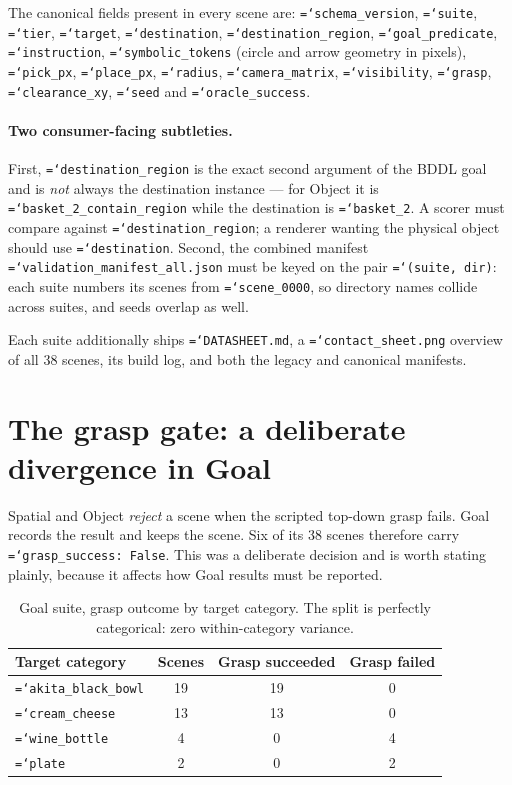 \documentclass[11pt,a4paper]{article}
\newcommand{\code}[1]{\texttt{\small\hyphenchar\font=`\-\relax #1}}
\begin{document}
The canonical fields present in every scene are: \code{schema\_version},
\code{suite}, \code{tier}, \code{target}, \code{destination},
\code{destination\_region}, \code{goal\_predicate}, \code{instruction},
\code{symbolic\_tokens} (circle and arrow geometry in pixels), \code{pick\_px},
\code{place\_px}, \code{radius}, \code{camera\_matrix}, \code{visibility},
\code{grasp}, \code{clearance\_xy}, \code{seed} and \code{oracle\_success}.

\paragraph{Two consumer-facing subtleties.}
First, \code{destination\_region} is the exact second argument of the BDDL goal
and is \emph{not} always the destination instance --- for Object it is
\code{basket\_2\_contain\_region} while the destination is \code{basket\_2}. A
scorer must compare against \code{destination\_region}; a renderer wanting the
physical object should use \code{destination}. Second, the combined manifest
\code{validation\_manifest\_all.json} must be keyed on the pair
\code{(suite, dir)}: each suite numbers its scenes from \code{scene\_0000}, so
directory names collide across suites, and seeds overlap as well.

Each suite additionally ships \code{DATASHEET.md}, a \code{contact\_sheet.png}
overview of all 38 scenes, its build log, and both the legacy and canonical
manifests.

\section{The grasp gate: a deliberate divergence in Goal}
\label{sec:grasp}

Spatial and Object \emph{reject} a scene when the scripted top-down grasp fails.
Goal records the result and keeps the scene. Six of its 38 scenes therefore carry
\code{grasp\_success: False}. This was a deliberate decision and is worth stating
plainly, because it affects how Goal results must be reported.

\begin{table}[h]
\centering
\small
\begin{tabular}{lccc}
\toprule
\textbf{Target category} & \textbf{Scenes} & \textbf{Grasp succeeded} & \textbf{Grasp failed} \\
\midrule
\code{akita\_black\_bowl} & 19 & 19 & 0 \\
\code{cream\_cheese}      & 13 & 13 & 0 \\
\code{wine\_bottle}       & 4  & 0  & 4 \\
\code{plate}              & 2  & 0  & 2 \\
\bottomrule
\end{tabular}
\caption{Goal suite, grasp outcome by target category. The split is perfectly
categorical: zero within-category variance.}
\label{tab:grasp}
\end{table}
\end{document}
